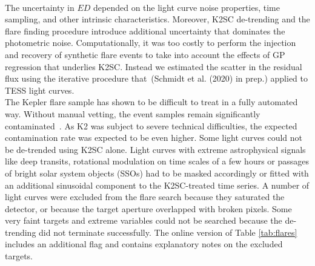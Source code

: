 \documentclass{aa}
\begin{document}
\\
The uncertainty in $ED$ depended on the light curve noise properties, time sampling, and other intrinsic characteristics. Moreover, K2SC de-trending and the flare finding procedure introduce additional uncertainty that dominates the photometric noise. Computationally, it was too costly to perform the injection and recovery of synthetic flare events to take into account the effects of GP regression that underlies K2SC. Instead we estimated the scatter in the residual flux using the iterative procedure that~(Schmidt et al. (2020) in prep.) applied to TESS light curves.
\\
The Kepler flare sample has shown to be difficult to treat in a fully automated way. Without manual vetting, the event samples remain significantly contaminated~\citep{yang_keplerflares_2019}. As K2 was subject to severe technical difficulties, the expected contamination rate was expected to be even higher. Some light curves could not be de-trended using K2SC alone. Light curves with extreme astrophysical signals like deep transits, rotational modulation on time scales of a few hours or passages of bright solar system objects (SSOs) had to be masked accordingly or fitted with an additional sinusoidal component to the K2SC-treated time series. A number of light curves were excluded from the flare search because they saturated the detector, or because the target aperture overlapped with broken pixels. Some very faint targets and extreme variables could not be searched because the de-trending did not terminate successfully. The online version of Table \ref{tab:flares} includes an additional flag and contains explanatory notes on the excluded targets.
\end{document}
